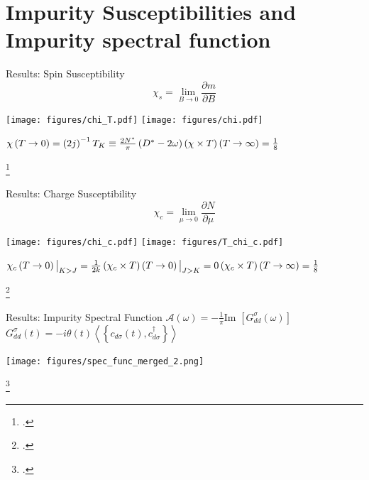 \documentclass[aspectratio=169]{beamer}
\newcommand{\cen}[1]{\begin{center}{#1}\end{center}}
\begin{document}
\section{Impurity Susceptibilities and Impurity spectral function}
\begin{frame}[noframenumbering]{Results: Spin Susceptibility}
	\vspace*{-20pt}
	\[\chi_s = \lim_{B \to 0} \frac{\partial{m}}{\partial{B}}\]
\cen{
	\hspace*{-20pt}
	\texttt{[image: figures/chi\_T.pdf]}
	\hspace*{25pt}
	\texttt{[image: figures/chi.pdf]}
}
\hspace*{20pt}\large{\(
\chi\left( T \to 0 \right) = \left(2j\right)^{-1} \hspace*{\fill} T_K \equiv \frac{2N^*}{\pi}\left(D^* - 2\omega\right)\hspace*{\fill} \left(\chi \times T\right) \left( T \to \infty \right) = \frac{1}{8}\)}

\footcite{wilson, hrk-nrg}
\end{frame}

\begin{frame}[noframenumbering]{Results: Charge Susceptibility}
	\vspace*{-15pt}
	\[\chi_c = \lim_{\mu \to 0} \frac{\partial{N}}{\partial{\mu}}\]
\cen{
	\hspace*{-20pt}
	\texttt{[image: figures/chi\_c.pdf]}
	\hspace*{25pt}
	\texttt{[image: figures/T\_chi\_c.pdf]}
}
\large{\(
\chi_c \left(T \to 0\right)\big\vert_{K>J} = \frac{1}{2k} \hspace*{\fill} \left(\chi_c\times T\right)\left(T \to 0\right)\big\vert_{J>K} = 0 \hspace*{\fill} \left(\chi_c\times T\right)\left( T \to \infty \right) = \frac{1}{8}\)}

\footcite{taraphder,charge-kondo-Zitko}
\end{frame}

\begin{frame}[noframenumbering]{Results: Impurity Spectral Function}
	\(\mathcal{A(\omega)} = -\frac{1}{\pi}\text{Im }\left[G_{d d}^\sigma\left( \omega \right) \right]\) \hspace*{\fill} \(G_{d d}^\sigma\left(t\right) = -i\theta(t)\left<\left\{ c_{d\sigma}(t), c^\dagger_{d\sigma} \right\}\right>\)
\cen{
	\texttt{[image: figures/spec\_func\_merged\_2.png]}
}
\footcite{hewson,bulla_costi_nrg}
\end{frame}
\end{document}
